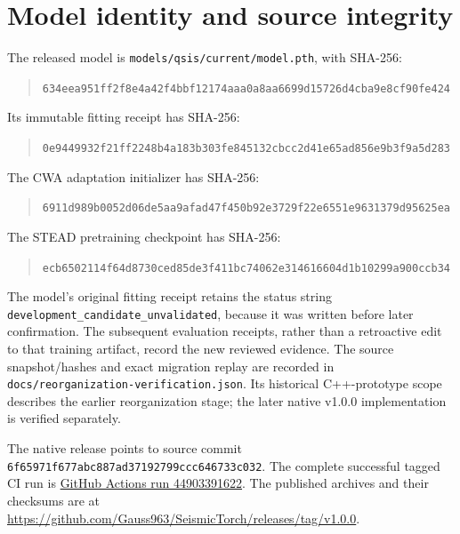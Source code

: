 \documentclass[a4paper,11pt,oneside]{article}
\newcommand{\code}[1]{\nolinkurl{#1}}
\begin{document}
\section{Model identity and source integrity}\label{app:provenance}
The released model is \code{models/qsis/current/model.pth}, with SHA-256:
\begin{quote}\small\nolinkurl{634eea951ff2f8e4a42f4bbf12174aaa0a8aa6699d15726d4cba9e8cf90fe424}\end{quote}
Its immutable fitting receipt has SHA-256:
\begin{quote}\small\nolinkurl{0e9449932f21ff2248b4a183b303fe845132cbcc2d41e65ad856e9b3f9a5d283}\end{quote}
The CWA adaptation initializer has SHA-256:
\begin{quote}\small\nolinkurl{6911d989b0052d06de5aa9afad47f450b92e3729f22e6551e9631379d95625ea}\end{quote}
The STEAD pretraining checkpoint has SHA-256:
\begin{quote}\small\nolinkurl{ecb6502114f64d8730ced85de3f411bc74062e314616604d1b10299a900ccb34}\end{quote}

The model's original fitting receipt retains the status string
\code{development_candidate_unvalidated}, because it was written before later
confirmation. The subsequent evaluation receipts, rather than a retroactive
edit to that training artifact, record the new reviewed evidence. The source
snapshot/hashes and exact migration replay are recorded in
\code{docs/reorganization-verification.json}. Its historical C++-prototype
scope describes the earlier reorganization stage; the later native v1.0.0
implementation is verified separately.

The native release points to source commit
\code{6f65971f677abc887ad37192799ccc646733c032}. The complete successful tagged
CI run is \href{https://github.com/Gauss963/SeismicTorch/actions/runs/44903391622}{GitHub Actions run 44903391622}.
The published archives and their checksums are at
\url{https://github.com/Gauss963/SeismicTorch/releases/tag/v1.0.0}.
\end{document}
